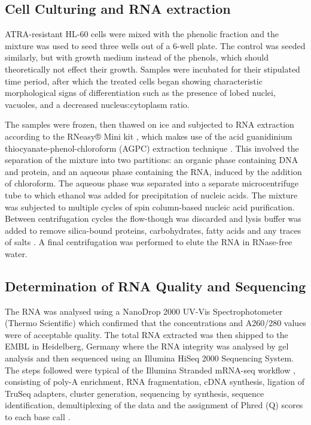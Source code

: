 \subsection{Cell Culturing and RNA extraction}
\ac{ATRA}-resistant HL-60 cells were mixed with the phenolic fraction and the mixture was used to seed three wells out of a 6-well plate. The control was seeded similarly, but with growth medium instead of the phenols, which should theoretically not effect their growth. Samples were incubated for their stipulated time period, after which the treated cells began showing characteristic morphological signs of differentiation such as the presence of lobed nuclei, vacuoles, and a decreased nucleus:cytoplasm ratio.

The samples were frozen, then thawed on ice and subjected to RNA extraction according to the RNeasy® Mini kit \citep{RNeasy}, which makes use of the acid guanidinium thiocyanate-phenol-chloroform (AGPC) extraction technique \citep{chomczynski1987single}. This involved the separation of the mixture into two partitions: an organic phase containing DNA and protein, and an aqueous phase containing the RNA, induced by the addition of chloroform. The aqueous phase was separated into a separate microcentrifuge tube to which ethanol was added for precipitation of nucleic acids. The mixture was subjected to multiple cycles of spin column-based nucleic acid purification. Between centrifugation cycles the flow-though was discarded and lysis buffer was added to remove silica-bound proteins, carbohydrates, fatty acids and any traces of salts \citep{matson2009microarray}. A final centrifugation was performed to elute the RNA in RNase-free water.


\subsection{Determination of RNA Quality and Sequencing}
The RNA was analysed using a NanoDrop 2000 UV-Vis Spectrophotometer (Thermo Scientific) which confirmed that the concentrations and A260/280 values were of acceptable quality. The total RNA extracted was then shipped to the \ac{EMBL} in Heidelberg, Germany where the RNA integrity was analysed by gel analysis and then sequenced using an Illumina HiSeq 2000 Sequencing System. The steps followed were typical of the Illumina Stranded mRNA-seq workflow \citep{HiSeq2000}, consisting of poly-A enrichment, RNA fragmentation, cDNA synthesis, ligation of TruSeq adapters, cluster generation, sequencing by synthesis, sequence identification, demultiplexing of the data and the assignment of Phred (Q) scores to each base call \citep{zhong2011high, wang2011low, pease2012rapid}.

